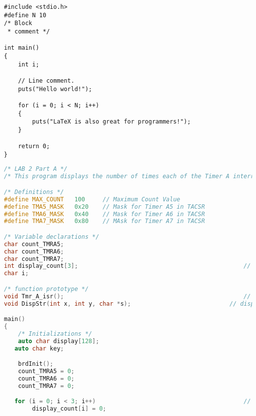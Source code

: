 \begin{lstlisting}
#include <stdio.h>
#define N 10
/* Block
 * comment */

int main()
{
    int i;

    // Line comment.
    puts("Hello world!");
    
    for (i = 0; i < N; i++)
    {
        puts("LaTeX is also great for programmers!");
    }

    return 0;
}
\end{lstlisting}


\begin{lstlisting}[language=C++]
/* LAB 2 Part A */
/* This program displays the number of times each of the Timer A interrupts have occured on the computer monitor */

/* Definitions */
#define	MAX_COUNT	100     // Maximum Count Value
#define TMA5_MASK   0x20    // Mask for Timer A5 in TACSR
#define TMA6_MASK	0x40    // Mask for Timer A6 in TACSR
#define TMA7_MASK	0x80    // MAsk for Timer A7 in TACSR

/* Variable declarations */
char count_TMRA5;														// This variable will count the number of times Timer A5 has triggered an interrupted
char count_TMRA6;														// This variable will count the number of times Timer A6 has triggered an interrupted
char count_TMRA7;														// This variable will count the number of times Timer A7 has triggered an interrupted
int display_count[3];												// This variable will hold the count values divided by 100
char i;																	// iterator

/* function prototype */
void Tmr_A_isr(); 													// Timer A interrupt service routine
void DispStr(int x, int y, char *s);							// display strings on computer monitor

main()
{
	/* Initializations */
	auto char display[128];
   auto char key;

	brdInit();
	count_TMRA5 = 0;													// initialize counters to zero
	count_TMRA6 = 0;													// initialize counters to zero
	count_TMRA7 = 0;													// initialize counters to zero

   for (i = 0; i < 3; i++)											// initialize display counters to zero
		display_count[i] = 0;



\end{lstlisting}
